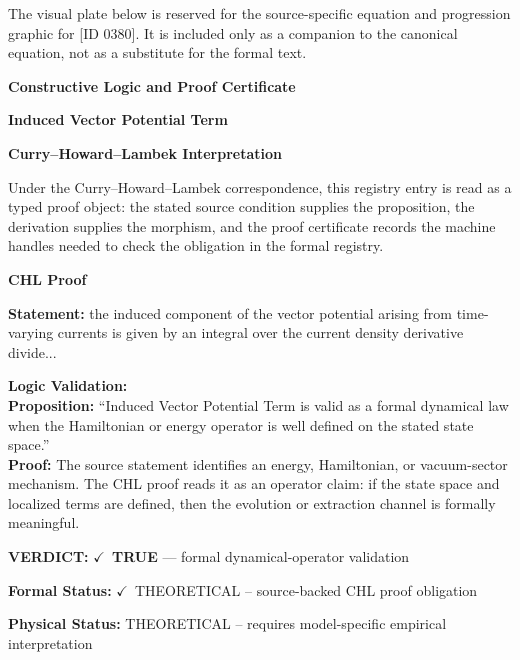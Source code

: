 \begingroup\footnotesize\sloppy
The visual plate below is reserved for the source-specific equation and progression graphic for [ID 0380]. It is included only as a companion to the canonical equation, not as a substitute for the formal text.
\par\endgroup
\ifTZPDarkEdition
{}
\fi

\clearpage
\begingroup\tzpsupportsetup
\noindent\textbf{\fontsize{10.8pt}{12.8pt}\selectfont [ID 0380] Constructive Logic and Proof Certificate}\par
\noindent\textbf{\fontsize{10pt}{12pt}\selectfont Induced Vector Potential Term}\par
\vspace{0.45em}
\begingroup
\footnotesize
\setlength{\parskip}{0.22em}
\setlength{\parindent}{0pt}
\noindent\textbf{Curry--Howard--Lambek Interpretation}\par
Under the Curry--Howard--Lambek correspondence, this registry entry is read as a typed proof
object: the stated source condition supplies the proposition, the derivation supplies the
morphism, and the proof certificate records the machine handles needed to check the obligation
in the formal registry.

\vspace{0.45em}
\noindent\textbf{CHL Proof}\par
\textbf{Statement:} the induced component of the vector potential arising from time-varying currents is
given by an integral over the current density derivative divide...

\textbf{Logic Validation:}\\
\textbf{Proposition:} ``Induced Vector Potential Term is valid as a formal dynamical law when the Hamiltonian or
energy operator is well defined on the stated state space.''\\
\textbf{Proof:} The source statement identifies an energy, Hamiltonian, or vacuum-sector mechanism. The
CHL proof reads it as an operator claim: if the state space and localized terms are
defined, then the evolution or extraction channel is formally meaningful.

\textbf{VERDICT:} \ensuremath{\checkmark}\ \textbf{TRUE} --- formal dynamical-operator validation

\textbf{Formal Status:} \ensuremath{\checkmark}\ THEORETICAL -- source-backed CHL proof obligation

\textbf{Physical Status:} THEORETICAL -- requires model-specific empirical interpretation
\par\vspace{0.45em}
\par
\ifTZPDarkEdition
{}
\fi
\endgroup
\endgroup
